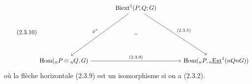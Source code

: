 \begin{equation}\tag{2.3.10}
\begin{tikzcd}[column sep=large, row sep=large]
 & \mathrm{Biext}^1(P,Q;G) \arrow[ddl, "\varphi^n"'] \arrow[ddr, "(2.3.5)"] & \\
 & - & \\
\mathrm{Hom}({}_nP\otimes{}_nQ,G) \arrow[rr, "(2.3.9)"] & & \mathrm{Hom}({}_nP,{}_n\underline{\mathrm{Ext}}^1(nQnG))
\end{tikzcd}
\end{equation}
où la flèche horizontale (2.3.9) est un isomorphisme si on a (2.3.2).

